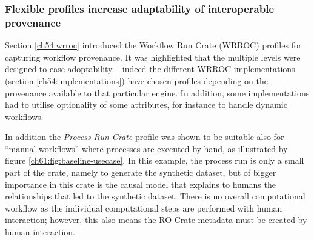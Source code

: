 \subsubsection{Flexible profiles increase adaptability of interoperable provenance}
\label{ch61:provenance}


Section \vref{ch54:wrroc} introduced the Workflow Run Crate (WRROC) profiles for capturing workflow provenance. It was highlighted that the multiple levels were designed to ease adoptability -- indeed the different WRROC implementations (section \vref{ch54:implementations}) have chosen  profiles depending on the provenance available to that particular engine. 
In addition, some implementations had to utilise optionality of some attributes, for instance to handle dynamic workflows. 

In addition the \emph{Process Run Crate} profile was shown to be suitable also for ``manual workflows'' where processes are executed by hand, as illustrated by figure \vref{ch61:fig:baseline-usecase}.
In this example, the process run is only a small part of the crate, namely to generate the synthetic dataset, but of bigger importance in this crate is the causal model that explains to humans the relationships that led to the synthetic dataset. 
There is no overall computational workflow as the individual computational steps are performed with human interaction; however, this also means the RO-Crate metadata must be created by human interaction.



